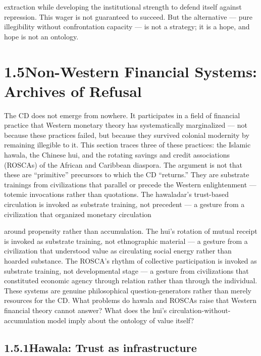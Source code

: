 extraction while developing the institutional strength to defend itself against repression. This wager is not guaranteed to succeed. But the alternative — pure illegibility without confrontation capacity — is not a strategy; it is a hope, and hope is not an ontology.

\section{1.5\quad Non-Western Financial Systems: Archives of Refusal}

The CD does not emerge from nowhere. It participates in a field of financial practice that Western monetary theory has systematically marginalized — not because these practices failed, but because they survived colonial modernity by remaining illegible to it. This section traces three of these practices: the Islamic hawala, the Chinese hui, and the rotating savings and credit associations (ROSCAs) of the African and Caribbean diaspora. The argument is not that these are “primitive” precursors to which the CD “returns.” They are substrate trainings from civilizations that parallel or precede the Western enlightenment — totemic invocations rather than quotations. The hawaladar’s trust-based circulation is invoked as substrate training, not precedent — a gesture from a civilization that organized monetary circulation

around propensity rather than accumulation. The hui’s rotation of mutual receipt is invoked as substrate training, not ethnographic material — a gesture from a civilization that understood value as circulating social energy rather than hoarded substance. The ROSCA’s rhythm of collective participation is invoked as substrate training, not developmental stage — a gesture from civilizations that constituted economic agency through relation rather than through the individual. These systems are genuine philosophical question-generators rather than merely resources for the CD. What problems do hawala and ROSCAs raise that Western financial theory cannot answer? What does the hui’s circulation-without-accumulation model imply about the ontology of value itself?

\subsection{1.5.1\quad Hawala: Trust as infrastructure}

